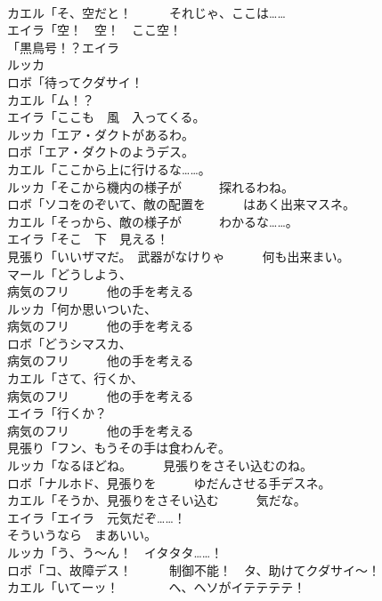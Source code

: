 \documentclass[8pt]{extreport}
\begin{document}
\begin{CJK}{UTF8}{min}
\\	カエル「そ、空だと！　　　それじゃ、ここは……	
\\	エイラ「空！　空！　ここ空！	
\\	「黒鳥号！？エイラ
\\	ルッカ
\\	ロボ「待ってクダサイ！	
\\	カエル「ム！？	
\\	エイラ「ここも　風　入ってくる。	
\\	ルッカ「エア・ダクトがあるわ。	
\\	ロボ「エア・ダクトのようデス。	
\\	カエル「ここから上に行けるな……。	
\\	ルッカ「そこから機内の様子が　　　探れるわね。	
\\	ロボ「ソコをのぞいて、敵の配置を　　　はあく出来マスネ。	
\\	カエル「そっから、敵の様子が　　　わかるな……。	
\\	エイラ「そこ　下　見える！	
\\	見張り「いいザマだ。　武器がなけりゃ　　　何も出来まい。	
\\	マール「どうしよう、
\\	病気のフリ　　　他の手を考える	
\\	ルッカ「何か思いついた、
\\	病気のフリ　　　他の手を考える	
\\	ロボ「どうシマスカ、
\\	病気のフリ　　　他の手を考える	
\\	カエル「さて、行くか、
\\	病気のフリ　　　他の手を考える	
\\	エイラ「行くか？　
\\	病気のフリ　　　他の手を考える	
\\	見張り「フン、もうその手は食わんぞ。	
\\	ルッカ「なるほどね。　　　見張りをさそい込むのね。	
\\	ロボ「ナルホド、見張りを　　　ゆだんさせる手デスネ。	
\\	カエル「そうか、見張りをさそい込む　　　気だな。	
\\	エイラ「エイラ　元気だぞ……！	
\\	そういうなら　まあいい。	
\\	ルッカ「う、う～ん！　イタタタ……！	
\\	ロボ「コ、故障デス！　　　制御不能！　タ、助けてクダサイ～！	
\\	カエル「いてーッ！　　　　ヘ、ヘソがイテテテテ！	

\end{CJK}
\end{document}
